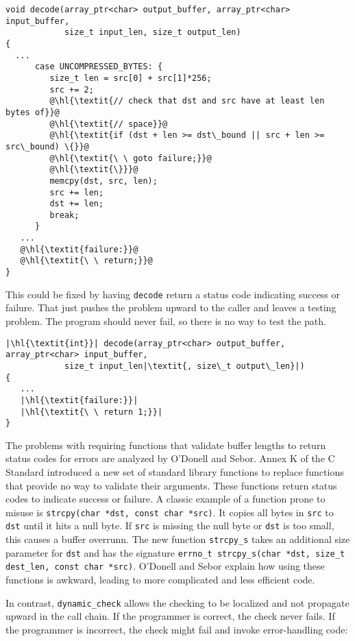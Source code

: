 \begin{lstlisting}[escapechar=\@]
void decode(array_ptr<char> output_buffer, array_ptr<char> input_buffer,
            size_t input_len, size_t output_len)
{
  ...
      case UNCOMPRESSED_BYTES: {
         size_t len = src[0] + src[1]*256;
         src += 2;
         @\hl{\textit{// check that dst and src have at least len bytes of}}@
         @\hl{\textit{// space}}@
         @\hl{\textit{if (dst + len >= dst\_bound || src + len >= src\_bound) \{}}@
         @\hl{\textit{\ \ goto failure;}}@
         @\hl{\textit{\}}}@
         memcpy(dst, src, len);
         src += len;
         dst += len;
         break;
      }
   ...
   @\hl{\textit{failure:}}@
   @\hl{\textit{\ \ return;}}@
}
\end{lstlisting}

This could be fixed by having \lstinline+decode+ return a status code
indicating success or failure. That just pushes the problem upward to
the caller and leaves a testing problem. The program should never fail,
so there is no way to test the path.

\begin{lstlisting}[escapechar=\|]
|\hl{\textit{int}}| decode(array_ptr<char> output_buffer, array_ptr<char> input_buffer,
            size_t input_len|\textit{, size\_t output\_len}|)
{
   ...
   |\hl{\textit{failure:}}|
   |\hl{\textit{\ \ return 1;}}|
}
\end{lstlisting}

The problems with requiring functions that validate buffer lengths to
return status codes for errors are analyzed by O'Donell and Sebor\cite{ODonell2015}. 
Annex K of the C Standard \cite{ISO2011} introduced a new set of standard library functions to replace
functions that provide no way to validate their arguments. These
functions return status codes to indicate success or failure. A classic
example of a function prone to misuse is
\lstinline+strcpy(char *dst, const char *src)+.
It copies all bytes in \lstinline+src+ to \lstinline+dst+ until
it hits a null byte. If \lstinline+src+ is missing the null byte or
\lstinline+dst+ is too small, this causes a buffer overrunn. The new
function \lstinline+strcpy_s+ takes an additional size parameter for
\lstinline+dst+ and has the signature
\lstinline+errno_t strcpy_s(char *dst, size_t dest_len, const char *src)+.
O'Donell and Sebor explain how
using these functions is awkward, leading to more complicated and less
efficient code.

In contrast, \lstinline+dynamic_check+ allows the checking to be localized
and not propagate upward in the call chain. If the programmer is
correct, the check never fails. If the programmer is incorrect, the
check might fail and invoke error-handling code:

